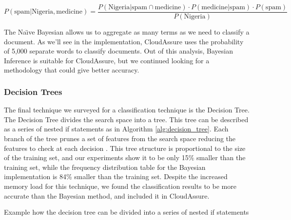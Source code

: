 \begin{equation}
    P(\text{spam} | \text{Nigeria}, \text{medicine}) = \frac{P(\text{Nigeria}
    | \text{spam} \cap \text{medicine} ) \cdot P(\text{medicine}
    | \text{spam}) \cdot P(\text{spam})}{P(\text{Nigeria})}
    \label{eq:BayesSpamMedicine}
\end{equation}

The Na\"{\i}ve Bayesian allows us to aggregate as many terms as we need to classify
a document. As we'll see in the implementation, CloudAssure uses the probability of 5,000
separate words to classify documents. Out of this analysis,  Bayesian
Inference is
suitable for CloudAssure, but we continued looking for a methodology that could
give better accuracy.
\subsubsection{Decision Trees}
The final technique we surveyed for a classification technique is the Decision
Tree. The Decision Tree divides the search space into a tree. This tree can be
described as a series of nested if statements as in
Algorithm \ref{alg:decision_tree}. Each branch of the
tree prunes a set of features from the search space reducing the features to
check at each decision \autocite{Segaran2008}. This tree structure is
proportional to the size of the training set, and our experiments show it to be
only 15\% smaller than the training set, while the frequency distribution table
for the Bayesian implementation is 84\% smaller than the training set. Despite
the increased memory load for this technique, we found the classification
results to be more accurate than the Bayesian method, and included it in
CloudAssure.

\begin{algorithm}
    \caption{Example how the decision tree can be divided into a series of
    nested if statements}
    \label{alg:decision_tree}
\begin{algorithmic}
                \EndIf
                \EndIf
                        \EndIf
                        \EndIf
                                \EndIf
                            \EndIf
                        \EndIf
                    \EndIf
                \EndIf
            \EndIf
        \EndIf
\end{algorithmic}
\end{algorithm}

